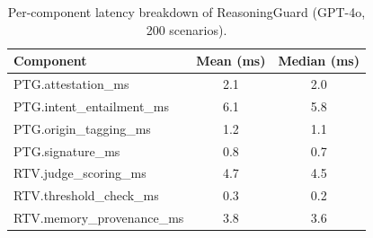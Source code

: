 \begin{table}[t]
\centering\small
\begin{tabular}{lcc}
\toprule
\textbf{Component} & \textbf{Mean (ms)} & \textbf{Median (ms)} \\
\midrule
PTG.attestation\_ms & 2.1 & 2.0 \\
PTG.intent\_entailment\_ms & 6.1 & 5.8 \\
PTG.origin\_tagging\_ms & 1.2 & 1.1 \\
PTG.signature\_ms & 0.8 & 0.7 \\
RTV.judge\_scoring\_ms & 4.7 & 4.5 \\
RTV.threshold\_check\_ms & 0.3 & 0.2 \\
RTV.memory\_provenance\_ms & 3.8 & 3.6 \\
\bottomrule
\end{tabular}
\caption{Per-component latency breakdown of ReasoningGuard (GPT-4o, 200 scenarios).}
\label{tab:latency}
\end{table}